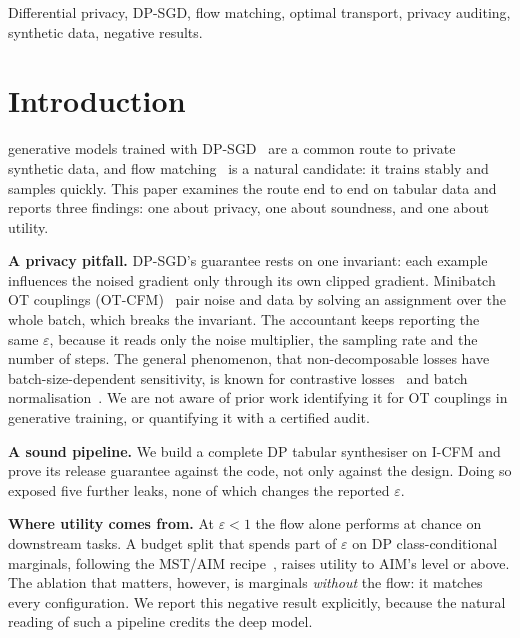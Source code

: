 \documentclass[journal]{IEEEtran}
\newcommand{\eps}{\varepsilon}
\begin{document}
\begin{IEEEkeywords}
Differential privacy, DP-SGD, flow matching, optimal transport, privacy auditing, synthetic data, negative results.
\end{IEEEkeywords}

\section{Introduction}
 generative models trained with DP-SGD~\cite{abadi2016deep} are a common route to private synthetic data, and flow matching~\cite{lipman2023flow,liu2023flow} is a natural candidate: it trains stably and samples quickly. This paper examines the route end to end on tabular data and reports three findings: one about privacy, one about soundness, and one about utility.

\textbf{A privacy pitfall.} DP-SGD's guarantee rests on one invariant: each example influences the noised gradient only through its own clipped gradient. Minibatch OT couplings (OT-CFM)~\cite{tong2024improving,pooladian2023multisample} pair noise and data by solving an assignment over the whole batch, which breaks the invariant. The accountant keeps reporting the same $\eps$, because it reads only the noise multiplier, the sampling rate and the number of steps. The general phenomenon, that non-decomposable losses have batch-size-dependent sensitivity, is known for contrastive losses~\cite{kong2025nondecomposable} and batch normalisation~\cite{yousefpour2021opacus}. We are not aware of prior work identifying it for OT couplings in generative training, or quantifying it with a certified audit.

\textbf{A sound pipeline.} We build a complete DP tabular synthesiser on I-CFM and prove its release guarantee against the code, not only against the design. Doing so exposed five further leaks, none of which changes the reported $\eps$.

\textbf{Where utility comes from.} At $\eps<1$ the flow alone performs at chance on downstream tasks. A budget split that spends part of $\eps$ on DP class-conditional marginals, following the MST/AIM recipe~\cite{mckenna2021winning,mckenna2022aim}, raises utility to AIM's level or above. The ablation that matters, however, is marginals \emph{without} the flow: it matches every configuration. We report this negative result explicitly, because the natural reading of such a pipeline credits the deep model.
\end{document}
